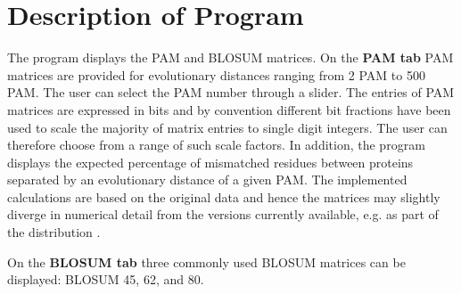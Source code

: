 \section{Description of Program}
The program displays the PAM and BLOSUM matrices. On the \textbf{PAM
  tab} PAM matrices are
provided for evolutionary distances ranging
from 2 PAM to 500 PAM. The user can select the PAM
number through a slider. The entries of PAM matrices are expressed in bits and by
convention different bit fractions have been used to scale the
majority of matrix entries to single digit integers. The user can therefore choose
from a range of such scale factors. In addition, the program displays
the expected percentage of mismatched residues between proteins
separated by an evolutionary distance of a given PAM.
The implemented calculations are based on the original data
\cite{day78:mod} and hence the matrices may slightly diverge in
numerical detail from the versions currently available, e.g. as part
of the  distribution \cite{alt97:gap}.

On the \textbf{BLOSUM tab} three commonly used BLOSUM matrices can be
displayed: BLOSUM 45, 62, and 80.


